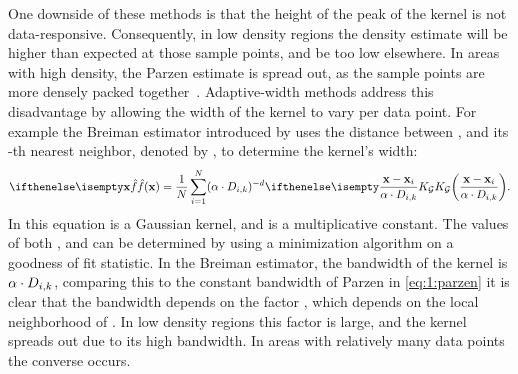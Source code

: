 	One downside of these methods is that the height of the peak of the kernel is not data-responsive. Consequently, in low density regions the density estimate will be higher than expected at those sample points, and be too low elsewhere. In areas with high density, the Parzen estimate is spread out, as the sample points are more densely packed \mbox{together \cite{breiman1977variable}}. Adaptive-width methods address this disadvantage by allowing the width of the kernel to vary per data point. For example the Breiman estimator introduced by \textcite{breiman1977variable} uses the distance between \varPattern[\itXis], and its \KNNK-th nearest neighbor, denoted by \varKNNDistance{\itXis}{\KNNK}, to determine the kernel's width:
	\begin{equation}\label{eq:1:BML}
	 	\varEstimatedDensityFunction{\varPattern} = \frac{1}{\varNumPatterns} \sum_{\itXis = 1}^{\varNumPatterns} (\varBMLconstant \cdot \varKNNDistance{\itXis}{k})^{-\varDim} \varKernel[\varGaussian]{\frac{\varPattern - \varPattern[\itXis]}{\varBMLconstant \cdot \varKNNDistance{\itXis}{k}}}.
	\end{equation}
	In this equation \varKernel[\varGaussian]{} is a Gaussian kernel, and \varBMLconstant is a multiplicative constant. The values of both \varBMLconstant, and \KNNK can be determined by using a minimization algorithm on a goodness of fit statistic. In the Breiman estimator, the bandwidth of the kernel is $\alpha \cdot D_{i, k}$, comparing this to the constant bandwidth \varBandwidth of Parzen in \cref{eq:1:parzen} it is clear that the bandwidth depends on the factor \varKNNDistance{\itXis}{\KNNK}, which depends on the local neighborhood of \varPattern[\itXis]. In low density regions this factor is large, and the kernel spreads out due to its high bandwidth. In areas with relatively many data points the converse occurs.

